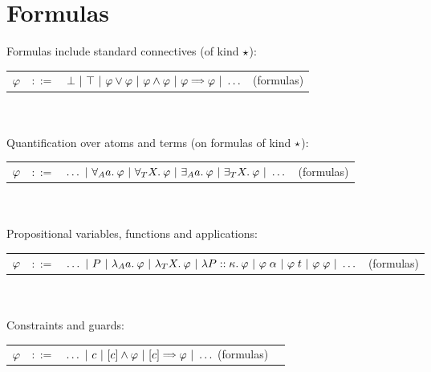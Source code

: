 \documentclass[english, mgr]{iithesis}
\begin{document}
\section{Formulas}
Formulas include standard connectives (of kind $\star$):

\begin{tabular}{rrlr}
$\varphi$ & $::=$ & $\bot
               \bnfor \top
               \bnfor \formphi \vee \formphi
               \bnfor \formphi \wedge \formphi
               \bnfor \formphi \fImp \formphi
               \bnfor \ldots $ & (formulas)
\end{tabular}
\\ \\
Quantification over atoms and terms (on formulas of kind $\star$):

\begin{tabular}{rrlr}
$\varphi$ & $::=$ & $\ldots
               \ |\  \forall_A a .\: \varphi
               \ |\  \forall_T X .\: \varphi
               \ |\  \exists_A a .\: \varphi
               \ |\  \exists_T X .\: \varphi
               \ |\  \ldots$
    & (formulas)
\end{tabular}
\\ \\
Propositional variables, functions and applications:

\begin{tabular}{rrlr}
$\varphi$ & $::=$ & $\ldots
               \ |\  P
               \ |\  \lambda_A a .\: \varphi
               \ |\  \lambda_T X .\: \varphi
               \ |\  \lambda P :: \kappa.\: \varphi
               \ |\  \varphi \;\alpha
               \ |\  \varphi \;t
               \ |\  \varphi \; \varphi
               \ |\  \ldots$
    & (formulas)
\end{tabular}
\\ \\
Constraints and guards:

\begin{tabular}{rrlr}
$\varphi$ & $::=$ & $\ldots
               \bnfor \fConstr{\constr}
               \bnfor \fCAnd{\constr} \formphi
               \bnfor \fCImp{\constr} \formphi
               \bnfor \ldots$  (formulas)
\end{tabular}
\end{document}
